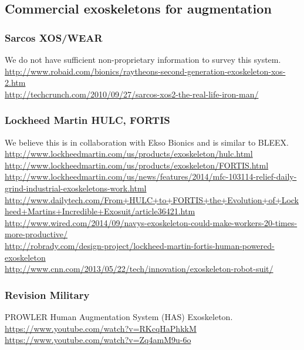 \subsection{Commercial exoskeletons for augmentation}


\subsubsection{Sarcos XOS/WEAR}

\noindent
We do not have sufficient non-proprietary information to survey
this system.\\
\url{http://www.robaid.com/bionics/raytheons-second-generation-exoskeleton-xos-2.htm}\\
\url{http://techcrunch.com/2010/09/27/sarcos-xos2-the-real-life-iron-man/}\\

\subsubsection{Lockheed Martin HULC, FORTIS}

\noindent
We believe this is in collaboration with Ekso Bionics and is similar
to BLEEX.\\
\url{http://www.lockheedmartin.com/us/products/exoskeleton/hulc.html}\\
\url{http://www.lockheedmartin.com/us/products/exoskeleton/FORTIS.html}\\
\url{http://www.lockheedmartin.com/us/news/features/2014/mfc-103114-relief-daily-grind-industrial-exoskeletons-work.html}\\
\url{http://www.dailytech.com/From+HULC+to+FORTIS+the+Evolution+of+Lockheed+Martins+Incredible+Exosuit/article36421.htm}\\
\url{http://www.wired.com/2014/09/navys-exoskeleton-could-make-workers-20-times-more-productive/}\\
\url{http://robrady.com/design-project/lockheed-martin-fortis-human-powered-exoskeleton}\\
\url{http://www.cnn.com/2013/05/22/tech/innovation/exoskeleton-robot-suit/}

\subsubsection{Revision Military}

\noindent
PROWLER Human Augmentation System (HAS) Exoskeleton.\\
\url{https://www.youtube.com/watch?v=RKcqHaPhkkM}\\
\url{https://www.youtube.com/watch?v=Zq4amM9u-6o}\\

